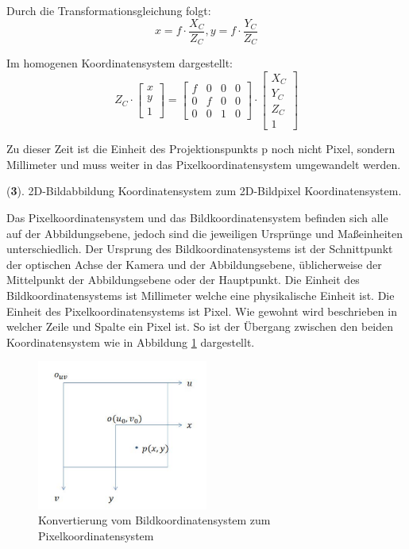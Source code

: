 Durch die Transformationsgleichung folgt: 
\begin{equation}
   x = f \cdot \frac{X_C}{Z_C}, y = f \cdot \frac{Y_C}{Z_C}
\end{equation}

Im homogenen Koordinatensystem dargestellt:
\begin{equation}
   Z_C \cdot \begin{bmatrix}
	x \\  
	y \\
	1
	\end{bmatrix} = \begin{bmatrix}
	f & 0 & 0 & 0	\\
	0 & f & 0 & 0	\\
	0 & 0 & 1 & 0	
	\end{bmatrix} \cdot \begin{bmatrix}
	X_C \\  
	Y_C \\
	Z_C \\
	1
	\end{bmatrix}
\end{equation}

Zu dieser Zeit ist die Einheit des Projektionspunkts p noch nicht Pixel, sondern Millimeter und muss weiter in das Pixelkoordinatensystem umgewandelt werden.

(\textbf{3}). 2D-Bildabbildung Koordinatensystem zum 2D-Bildpixel Koordinatensystem.

Das Pixelkoordinatensystem und das Bildkoordinatensystem befinden sich alle auf der Abbildungsebene, jedoch sind die jeweiligen Ursprünge und Maßeinheiten unterschiedlich. Der Ursprung des Bildkoordinatensystems ist der Schnittpunkt der optischen Achse der Kamera und der Abbildungsebene, üblicherweise der Mittelpunkt der Abbildungsebene oder der Hauptpunkt. Die Einheit des Bildkoordinatensystems ist Millimeter welche eine physikalische Einheit ist. Die Einheit des Pixelkoordinatensystems ist Pixel. Wie gewohnt wird beschrieben in welcher Zeile und Spalte ein Pixel ist. So ist der Übergang zwischen den beiden Koordinatensystem wie in Abbildung \ref{fig:Konvertierung von Pixelkoordinatensystem zu Bildkoordinatensystem} dargestellt. 

\begin{figure}[H]
 \centering 
 \includegraphics[keepaspectratio,width=0.5\textwidth]{images/3_Ersteverfahren/Kamera/imagezupixel.pdf}
 \caption{Konvertierung vom Bildkoordinatensystem zum Pixelkoordinatensystem}
 \label{fig:Konvertierung von Pixelkoordinatensystem zu Bildkoordinatensystem}
\end{figure} 

